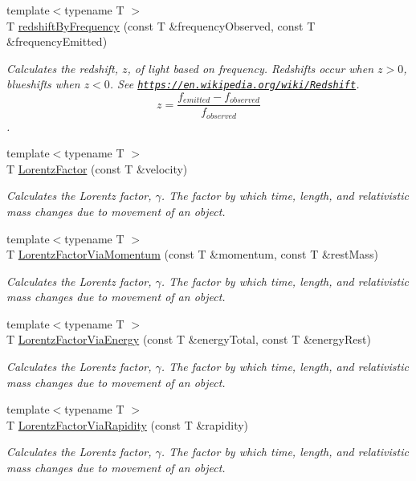\begin{DoxyCompactItemize}
{\footnotesize template$<$typename T $>$ }\\T \mbox{\hyperlink{group___e_g_x_phys-_optics_gacc6d3b2922061214d64b89a4b8e3967a}{redshift\+By\+Frequency}} (const T \&frequency\+Observed, const T \&frequency\+Emitted)
\begin{DoxyCompactList}\small\item\em Calculates the redshift, $z$, of light based on frequency. Redshifts occur when $z > 0$, blueshifts when $z < 0$. See \href{https://en.wikipedia.org/wiki/Redshift}{\tt https\+://en.\+wikipedia.\+org/wiki/\+Redshift}. \[z=\frac{f_{emitted}-f_{observed}}{f_{observed}}\]. \end{DoxyCompactList}\item 
{\footnotesize template$<$typename T $>$ }\\T \mbox{\hyperlink{group___e_g_x_phys-_lorentz_transformations_ga5f9b11c1f4c3ae26a7e64f02c22d5a75}{Lorentz\+Factor}} (const T \&velocity)
\begin{DoxyCompactList}\small\item\em Calculates the Lorentz factor, $\gamma$. The factor by which time, length, and relativistic mass changes due to movement of an object. \end{DoxyCompactList}\item 
{\footnotesize template$<$typename T $>$ }\\T \mbox{\hyperlink{group___e_g_x_phys-_lorentz_transformations_ga1ea24128654ac333dd843afdd5c003b7}{Lorentz\+Factor\+Via\+Momentum}} (const T \&momentum, const T \&rest\+Mass)
\begin{DoxyCompactList}\small\item\em Calculates the Lorentz factor, $\gamma$. The factor by which time, length, and relativistic mass changes due to movement of an object. \end{DoxyCompactList}\item 
{\footnotesize template$<$typename T $>$ }\\T \mbox{\hyperlink{group___e_g_x_phys-_lorentz_transformations_ga601de8c039be89a9abea22bc459436c9}{Lorentz\+Factor\+Via\+Energy}} (const T \&energy\+Total, const T \&energy\+Rest)
\begin{DoxyCompactList}\small\item\em Calculates the Lorentz factor, $\gamma$. The factor by which time, length, and relativistic mass changes due to movement of an object. \end{DoxyCompactList}\item 
{\footnotesize template$<$typename T $>$ }\\T \mbox{\hyperlink{group___e_g_x_phys-_lorentz_transformations_ga8064f5bce1d2ca5f7bc39d95ba4d2dd9}{Lorentz\+Factor\+Via\+Rapidity}} (const T \&rapidity)
\begin{DoxyCompactList}\small\item\em Calculates the Lorentz factor, $\gamma$. The factor by which time, length, and relativistic mass changes due to movement of an object. \end{DoxyCompactList}\end{DoxyCompactItemize}
